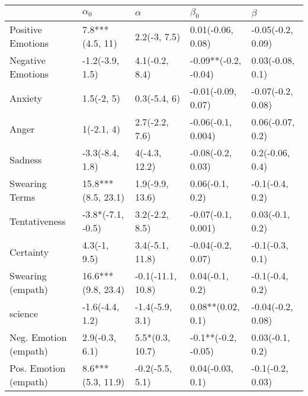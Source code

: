 \begin{tabular}{lllll}
\toprule
{} &          $\alpha_0$ &           $\alpha$ &             $\beta_0$ &            $\beta$ \\
\midrule
Positive Emotions     &     7.8***(4.5, 11) &       2.2(-3, 7.5) &     0.01(-0.06, 0.08) &  -0.05(-0.2, 0.09) \\
Negative Emotions     &     -1.2(-3.9, 1.5) &     4.1(-0.2, 8.4) &  -0.09**(-0.2, -0.04) &   0.03(-0.08, 0.1) \\
Anxiety               &          1.5(-2, 5) &       0.3(-5.4, 6) &    -0.01(-0.09, 0.07) &  -0.07(-0.2, 0.08) \\
Anger                 &          1(-2.1, 4) &     2.7(-2.2, 7.6) &    -0.06(-0.1, 0.004) &   0.06(-0.07, 0.2) \\
Sadness               &     -3.3(-8.4, 1.8) &      4(-4.3, 12.2) &     -0.08(-0.2, 0.03) &    0.2(-0.06, 0.4) \\
Swearing Terms        &  15.8***(8.5, 23.1) &    1.9(-9.9, 13.6) &       0.06(-0.1, 0.2) &    -0.1(-0.4, 0.2) \\
Tentativeness         &   -3.8*(-7.1, -0.5) &     3.2(-2.2, 8.5) &    -0.07(-0.1, 0.001) &    0.03(-0.1, 0.2) \\
Certainty             &        4.3(-1, 9.5) &    3.4(-5.1, 11.8) &     -0.04(-0.2, 0.07) &    -0.1(-0.3, 0.1) \\
Swearing (empath)     &  16.6***(9.8, 23.4) &  -0.1(-11.1, 10.8) &       0.04(-0.1, 0.2) &    -0.1(-0.4, 0.2) \\
science               &     -1.6(-4.4, 1.2) &    -1.4(-5.9, 3.1) &     0.08**(0.02, 0.1) &  -0.04(-0.2, 0.08) \\
Neg. Emotion (empath) &      2.9(-0.3, 6.1) &    5.5*(0.3, 10.7) &   -0.1**(-0.2, -0.05) &    0.03(-0.1, 0.2) \\
Pos. Emotion (empath) &   8.6***(5.3, 11.9) &    -0.2(-5.5, 5.1) &      0.04(-0.03, 0.1) &   -0.1(-0.2, 0.03) \\
\bottomrule
\end{tabular}
